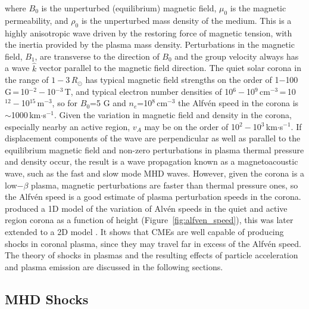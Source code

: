 where $B_{0}$ is the unperturbed (equilibrium) magnetic field, $\mu_{0}$ is the magnetic permeability, and $\rho_{0}$ is the unperturbed mass density of the medium. This is a highly anisotropic wave driven by the restoring force of magnetic tension, with the inertia provided by the plasma mass density. Perturbations in the magnetic field, $B_{1}$, are transverse to the direction of $B_0$ and the group velocity always has a wave $\hat{k}$ vector parallel to the magnetic field direction. The quiet solar corona in the range of $1-3$\,$R_{\odot}$ has typical magnetic field strengths on the order of 1$-$100\,G\,=\,10$^{-2}-$10$^{-3}$\,T, and typical electron number densities of 10$^{6} -$10$^{9}$\,cm$^{-3}$\,=\,10$^{12}-$10$^{15}$\,m$^{-3}$, so for $B_0$=5 G and $n_e$=10$^{8}$\,cm$^{-3}$ the Alfv\'{e}n speed in the corona is $\sim$1000\,km$\cdot$s$^{-1}$. Given the variation in magnetic field and density in the corona, especially nearby an active region, $v_{A}$ may be on the order of 10$^{2}-$10$^{3}$\,km$\cdot$s$^{-1}$. If displacement components of the wave are perpendicular as well as parallel to the equilibrium magnetic field and non-zero perturbations in plasma thermal pressure and density occur, the result is a wave propagation known as a magnetoacoustic wave, such as the fast and slow mode MHD waves. However, given the corona is a low$-\beta$ plasma, magnetic perturbations are faster than thermal pressure ones, so the Alfv\'{e}n speed is a good estimate of plasma perturbation speeds in the corona. \citet{mann2003} produced a 1D model of the variation of Alv\'{e}n speeds in the quiet and active region corona as a function of height (Figure~\ref{fig:alfven_speed}), this was later extended to a 2D model \citep{warmuth2005}. It shows that CMEs are well capable of producing {\color{blue}shocks in coronal plasma}, since they may travel far in excess of the Alfv\'{e}n speed. The theory of {\color{blue}shocks in plasmas} and the resulting effects of particle acceleration and plasma emission are discussed in the following sections.


\subsection{MHD Shocks}\label{sec:mhd_shocks}

